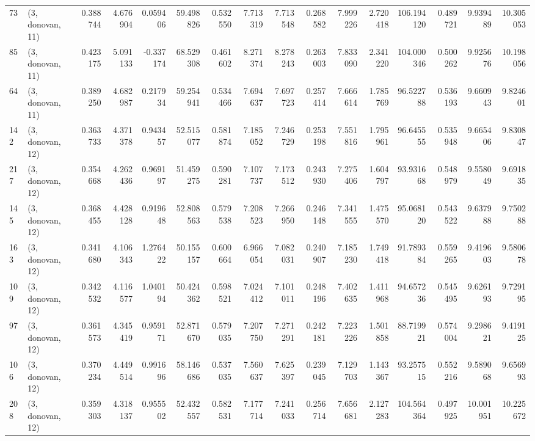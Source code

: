 \begin{tabular}{llrrrrrrrrrrrrrr}
73  &  (3, donovan, 11) &   0.388744 &   4.676904 &  0.059406 &   59.498826 &  0.532550 &   7.713319 &   7.713548 &  0.268582 &   7.999226 &   2.720418 &  106.194120 &  0.489721 &   9.939489 &  10.305053 \\
85  &  (3, donovan, 11) &   0.423175 &   5.091133 & -0.337174 &   68.529308 &  0.461602 &   8.271374 &   8.278243 &  0.263003 &   7.833090 &   2.341220 &  104.000346 &  0.500262 &   9.925676 &  10.198056 \\
64  &  (3, donovan, 11) &   0.389250 &   4.682987 &  0.217934 &   59.254941 &  0.534466 &   7.694637 &   7.697723 &  0.257414 &   7.666614 &   1.785769 &   96.522788 &  0.536193 &   9.660943 &   9.824601 \\
142 &  (3, donovan, 12) &   0.363733 &   4.371378 &  0.943457 &   52.515077 &  0.581874 &   7.185052 &   7.246729 &  0.253198 &   7.551816 &   1.795961 &   96.645555 &  0.535948 &   9.665406 &   9.830847 \\
217 &  (3, donovan, 12) &   0.354668 &   4.262436 &  0.969197 &   51.459275 &  0.590281 &   7.107737 &   7.173512 &  0.243930 &   7.275406 &   1.604797 &   93.931668 &  0.548979 &   9.558049 &   9.691835 \\
145 &  (3, donovan, 12) &   0.368455 &   4.428128 &  0.919648 &   52.808563 &  0.579538 &   7.208523 &   7.266950 &  0.246148 &   7.341555 &   1.475570 &   95.068120 &  0.543522 &   9.637988 &   9.750288 \\
163 &  (3, donovan, 12) &   0.341680 &   4.106343 &  1.276422 &   50.155157 &  0.600664 &   6.966054 &   7.082031 &  0.240907 &   7.185230 &   1.749418 &   91.789384 &  0.559265 &   9.419603 &   9.580678 \\
109 &  (3, donovan, 12) &   0.342532 &   4.116577 &  1.040194 &   50.424362 &  0.598521 &   7.024412 &   7.101011 &  0.248196 &   7.402635 &   1.411968 &   94.657236 &  0.545495 &   9.626193 &   9.729195 \\
97  &  (3, donovan, 12) &   0.361573 &   4.345419 &  0.959171 &   52.871670 &  0.579035 &   7.207750 &   7.271291 &  0.242181 &   7.223226 &   1.501858 &   88.719921 &  0.574004 &   9.298621 &   9.419125 \\
106 &  (3, donovan, 12) &   0.370234 &   4.449514 &  0.991696 &   58.146686 &  0.537035 &   7.560637 &   7.625397 &  0.239045 &   7.129703 &   1.143367 &   93.257515 &  0.552216 &   9.589068 &   9.656993 \\
208 &  (3, donovan, 12) &   0.359303 &   4.318137 &  0.955502 &   52.432557 &  0.582531 &   7.177714 &   7.241033 &  0.256714 &   7.656681 &   2.127283 &  104.564364 &  0.497925 &  10.001951 &  10.225672 \\

\end{tabular}

